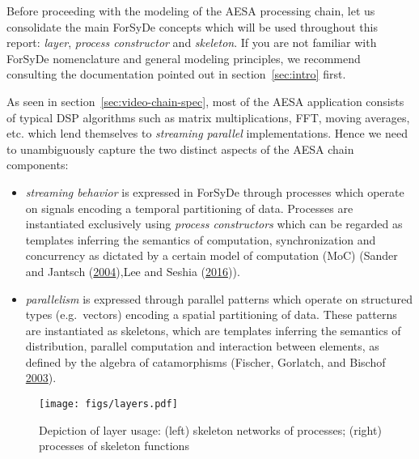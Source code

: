 \documentclass[
  a4paper,
]{article}
\begin{document}
Before proceeding with the modeling of the AESA processing chain, let us
consolidate the main ForSyDe concepts which will be used throughout this
report: \emph{layer}, \emph{process constructor} and \emph{skeleton}. If
you are not familiar with ForSyDe nomenclature and general modeling
principles, we recommend consulting the documentation pointed out in
section~\ref{sec:intro} first.

As seen in section~\ref{sec:video-chain-spec}, most of the AESA
application consists of typical DSP algorithms such as matrix
multiplications, FFT, moving averages, etc. which lend themselves to
\emph{streaming parallel} implementations. Hence we need to
unambiguously capture the two distinct aspects of the AESA chain
components:

\begin{itemize}
\item
  \emph{streaming behavior} is expressed in ForSyDe through processes
  which operate on signals encoding a temporal partitioning of data.
  Processes are instantiated exclusively using \emph{process
  constructors} which can be regarded as templates inferring the
  semantics of computation, synchronization and concurrency as dictated
  by a certain model of computation (MoC) (Sander and Jantsch
  (\protect\hyperlink{ref-sander-2004}{2004}),Lee and Seshia
  (\protect\hyperlink{ref-leeseshia-15}{2016})).
\item
  \emph{parallelism} is expressed through parallel patterns which
  operate on structured types (e.g.~vectors) encoding a spatial
  partitioning of data. These patterns are instantiated as skeletons,
  which are templates inferring the semantics of distribution, parallel
  computation and interaction between elements, as defined by the
  algebra of catamorphisms (Fischer, Gorlatch, and Bischof
  \protect\hyperlink{ref-Fischer-2003}{2003}).
\end{itemize}

\begin{figure}
\hypertarget{fig:atom-layers}{%
\centering
\texttt{[image: figs/layers.pdf]}
\caption{Depiction of layer usage: (left) skeleton networks of
processes; (right) processes of skeleton
functions}\label{fig:atom-layers}
}
\end{figure}
\end{document}
